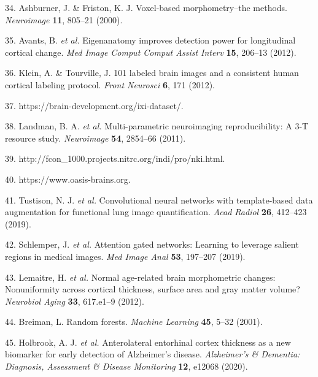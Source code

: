 \documentclass[12pt,]{article}
\begin{document}
\leavevmode\hypertarget{ref-Ashburner:2000aa}{}%
34. Ashburner, J. \& Friston, K. J. Voxel-based morphometry--the
methods. \emph{Neuroimage} \textbf{11}, 805--21 (2000).

\leavevmode\hypertarget{ref-Avants:2012aa}{}%
35. Avants, B. \emph{et al.} Eigenanatomy improves detection power for
longitudinal cortical change. \emph{Med Image Comput Comput Assist
Interv} \textbf{15}, 206--13 (2012).

\leavevmode\hypertarget{ref-Klein:2012aa}{}%
36. Klein, A. \& Tourville, J. 101 labeled brain images and a consistent
human cortical labeling protocol. \emph{Front Neurosci} \textbf{6}, 171
(2012).

\leavevmode\hypertarget{ref-ixi}{}%
37. https://brain-development.org/ixi-dataset/.

\leavevmode\hypertarget{ref-Landman:2011aa}{}%
38. Landman, B. A. \emph{et al.} Multi-parametric neuroimaging
reproducibility: A 3-T resource study. \emph{Neuroimage} \textbf{54},
2854--66 (2011).

\leavevmode\hypertarget{ref-nki}{}%
39. http://fcon\_1000.projects.nitrc.org/indi/pro/nki.html.

\leavevmode\hypertarget{ref-oasis}{}%
40. https://www.oasis-brains.org.

\leavevmode\hypertarget{ref-Tustison:2019ac}{}%
41. Tustison, N. J. \emph{et al.} Convolutional neural networks with
template-based data augmentation for functional lung image
quantification. \emph{Acad Radiol} \textbf{26}, 412--423 (2019).

\leavevmode\hypertarget{ref-Schlemper:2019aa}{}%
42. Schlemper, J. \emph{et al.} Attention gated networks: Learning to
leverage salient regions in medical images. \emph{Med Image Anal}
\textbf{53}, 197--207 (2019).

\leavevmode\hypertarget{ref-Lemaitre:2012aa}{}%
43. Lemaitre, H. \emph{et al.} Normal age-related brain morphometric
changes: Nonuniformity across cortical thickness, surface area and gray
matter volume? \emph{Neurobiol Aging} \textbf{33}, 617.e1--9 (2012).

\leavevmode\hypertarget{ref-Breiman:2001aa}{}%
44. Breiman, L. Random forests. \emph{Machine Learning} \textbf{45},
5--32 (2001).

\leavevmode\hypertarget{ref-holbrook2020anterolateral}{}%
45. Holbrook, A. J. \emph{et al.} Anterolateral entorhinal cortex
thickness as a new biomarker for early detection of Alzheimer's disease.
\emph{Alzheimer's \& Dementia: Diagnosis, Assessment \& Disease
Monitoring} \textbf{12}, e12068 (2020).
\end{document}
